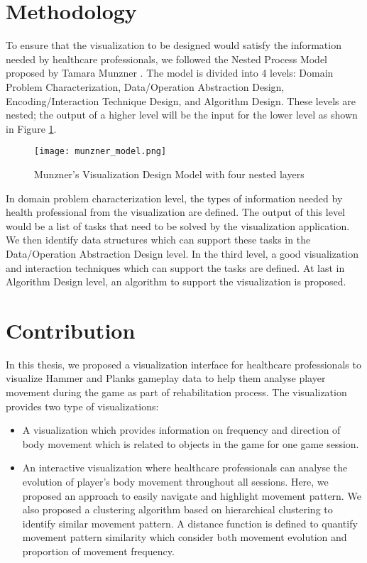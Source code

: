 \section{Methodology}

To ensure that the visualization to be designed would satisfy the information needed by healthcare professionals, we followed the Nested Process Model proposed by Tamara Munzner \cite{Munzner:2009:NMV:1638611.1639181}. The model is divided into 4 levels: Domain Problem Characterization, Data/Operation Abstraction Design, Encoding/Interaction Technique Design, and Algorithm Design. These levels are nested; the output of a higher level will be the input for the lower level as shown in Figure \ref{munzner_model}.

\begin{figure}
\centering
\texttt{[image: munzner\_model.png]}
\caption{Munzner's Visualization Design Model with four nested layers \label{munzner_model}}
\end{figure}

In domain problem characterization level, the types of information needed by health professional from the visualization are defined. The output of this level would be a list of tasks that need to be solved by the visualization application. We then identify data structures which can support these tasks in the Data/Operation Abstraction Design level. In the third level, a good visualization and interaction techniques which can support the tasks are defined. At last in Algorithm Design level, an algorithm to support the visualization is proposed.

\section{Contribution}
In this thesis, we proposed a visualization interface for healthcare professionals to visualize Hammer and Planks gameplay data to help them analyse player movement during the game as part of rehabilitation process. The visualization provides two type of visualizations:
\begin{itemize}
\item A visualization which provides information on frequency and direction of body movement which is related to objects in the game for one game session.
\item An interactive visualization where healthcare professionals can analyse the evolution of player's body movement throughout all sessions. Here, we proposed an approach to easily navigate and highlight movement pattern. We also proposed a clustering algorithm based on hierarchical clustering to identify similar movement pattern. A distance function is defined to quantify movement pattern similarity which consider both movement evolution and proportion of movement frequency.
\end{itemize}

